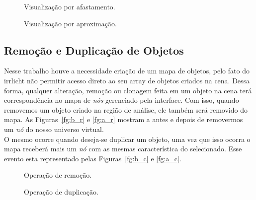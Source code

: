 \begin{figure}[htp]
	\begin{center}
\qquad
	\end{center}
	\caption{Visualização por afastamento.}
	\label{fg:afastamento}
\end{figure}

\begin{figure}[htp]
	\begin{center}
		\subfigure[[Visualização de objeto por aproximação normal(sem mudança de foco).]{\label{fg:apr}\texttt{[image: apr]}}
\qquad
	\end{center}
	\caption{Visualização por aproximação.}
	\label{fg:aproximacao}
\end{figure}

	\subsection{Remoção e Duplicação de Objetos}
	Nesse trabalho houve a necessidade criação de um mapa de objetos, pelo fato do irrlicht não permitir acesso direto ao seu array de objetos criados na cena. Dessa forma, qualquer alteração, remoção ou clonagem feita em um objeto na cena terá correspondência no mapa de \textit{nós} gerenciado pela interface. Com isso, quando removemos um objeto criado na região de análise, ele também será removido do mapa. As Figuras~\ref{fg:b_r} e \ref{fg:a_r} mostram a antes e depois de removermos um \textit{nó} do nosso universo virtual. \\
	
	O mesmo ocorre quando deseja-se duplicar um objeto, uma vez que isso ocorra o mapa receberá mais um \textit{nó} com as mesmas característica do selecionado. Esse evento esta representado pelas Figuras~\ref{fg:b_c} e \ref{fg:a_c}.


\begin{figure}[htp]
	\begin{center}
\qquad
	\end{center}
	\caption{Operação de remoção.}
	\label{fg:remocao}
\end{figure}
\begin{figure}[htp]
	\begin{center}
\qquad
	\end{center}
	\caption{Operação de duplicação.}
	\label{fg:duplicacao}
\end{figure}

